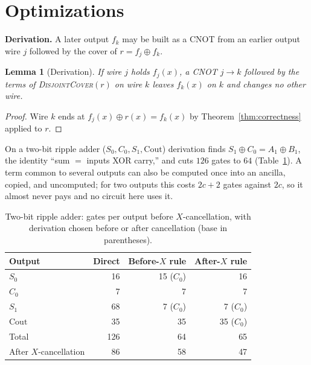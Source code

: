 \documentclass[conference]{IEEEtran}
\newcommand{\Algo}[1]{\textup{\textsc{#1}}}
\theoremstyle{plain}
\newtheorem{lemma}{Lemma}
\begin{document}
\section{Optimizations}
\textbf{Derivation.} A later output $f_k$ may be built as a CNOT from an
earlier output wire $j$ followed by the cover of $r=f_j\oplus f_k$.
\begin{lemma}[Derivation]
\label{lem:derive}
If wire $j$ holds $f_j(x)$, a CNOT $j\to k$ followed by the terms of
\Algo{DisjointCover}$(r)$ on wire $k$ leaves $f_k(x)$ on $k$ and changes
no other wire.
\end{lemma}
\begin{proof}
Wire $k$ ends at $f_j(x)\oplus r(x)=f_k(x)$ by
Theorem~\ref{thm:correctness} applied to $r$.
\end{proof}
On a two-bit ripple adder ($S_0,C_0,S_1,\mathrm{Cout}$) derivation finds
$S_1\oplus C_0=A_1\oplus B_1$, the identity ``sum $=$ inputs XOR carry,''
and cuts $126$ gates to $64$ (Table~\ref{tab:adder2}). A term common to several outputs can also
be computed once into an ancilla, copied, and uncomputed; for two
outputs this costs $2c+2$ gates against $2c$, so it almost never pays
and no circuit here uses it.

\begin{table}[t]
\centering
\caption{Two-bit ripple adder: gates per output before $X$-cancellation,
with derivation chosen before or after cancellation (base in parentheses).}
\label{tab:adder2}
\footnotesize
\begin{tabular}{@{}lrrr@{}}
\toprule
Output & Direct & Before-$X$ rule & After-$X$ rule\\
\midrule
$S_0$ & 16 & 15 ($C_0$) & 16\\
$C_0$ & 7 & 7 & 7\\
$S_1$ & 68 & 7 ($C_0$) & 7 ($C_0$)\\
$\mathrm{Cout}$ & 35 & 35 & 35 ($C_0$)\\
\midrule
Total & 126 & 64 & 65\\
After $X$-cancellation & 86 & 58 & 47\\
\bottomrule
\end{tabular}
\end{table}
\end{document}
